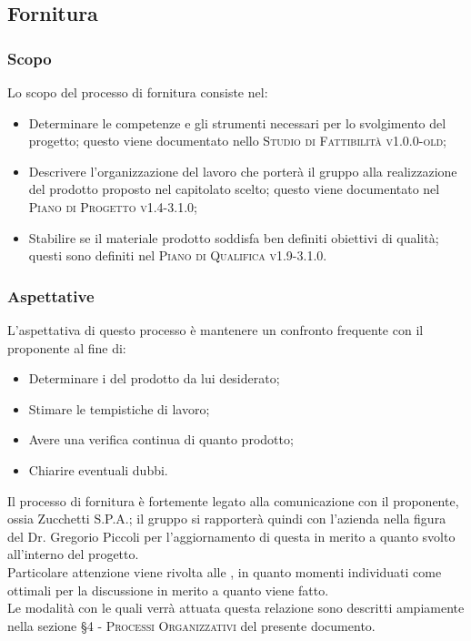 \documentclass[../norme-di-progetto.tex]{subfiles}
\begin{document}

\subsection{Fornitura}
\subsubsection{Scopo}
Lo scopo del processo di fornitura consiste nel:
\begin{itemize}
  \item Determinare le competenze e gli strumenti necessari per lo svolgimento del progetto; questo viene documentato nello \textsc{Studio di Fattibilità v1.0.0-old};
  \item Descrivere l'organizzazione del lavoro che porterà il gruppo alla realizzazione del prodotto proposto nel capitolato scelto; questo viene documentato nel \textsc{Piano di Progetto v1.4-3.1.0};
  \item Stabilire se il materiale prodotto soddisfa ben definiti obiettivi di qualità; questi sono definiti nel \textsc{Piano di Qualifica v1.9-3.1.0}.
\end{itemize}

\subsubsection{Aspettative}
L'aspettativa di questo processo è mantenere un confronto frequente con il proponente al fine di:
\begin{itemize}
  \item Determinare i  del prodotto da lui desiderato;
  \item Stimare le tempistiche di lavoro;
  \item Avere una verifica continua di quanto prodotto;
  \item Chiarire eventuali dubbi.
\end{itemize}
Il processo di fornitura è fortemente legato alla comunicazione con il proponente, ossia Zucchetti S.P.A.; il gruppo si rapporterà quindi con l'azienda nella figura del Dr. Gregorio Piccoli per l'aggiornamento di questa in merito a quanto svolto all'interno del progetto. \\
Particolare attenzione viene rivolta alle , in quanto momenti individuati come ottimali per la discussione in merito a quanto viene fatto. \\
Le modalità con le quali verrà attuata questa relazione sono descritti ampiamente nella sezione \textsc{\S 4 - Processi Organizzativi} del presente documento.
\end{document}
